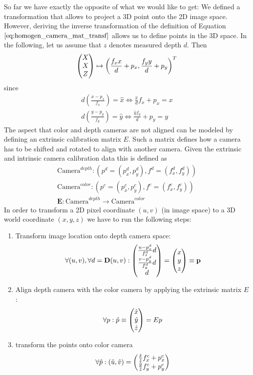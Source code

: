 So far we have exactly the opposite of what we would like to get: We defined a transformation that allows to project a 3D point onto the 2D image space. However, deriving the inverse transformation of the definition of Equation $\ref{eq:homogen_camera_mat_transf}$ allows us to define points in the 3D space. In the following, let us assume that $z$ denotes measured depth $d$. Then
\begin{equation}
	\colvec[X]{X}{Z} \mapsto \left( \frac{f_x x}{d} + p_x, \frac{f_y y}{d} + p_y \right)^T
\end{equation}
since
\begin{equation}
\begin{aligned}
	d \left( \frac{x - p_x}{f_x} \right) = \hat{x} \Leftrightarrow \frac{\hat{x}}{d} f_x + p_x = x \\
	d \left( \frac{y - p_y}{f_y} \right) = \hat{y} \Leftrightarrow \frac{\hat{y} f_y}{d} + p_y = y 
\end{aligned}
\label{eq:depth_tranfomation}
\end{equation}
The aspect that color and depth cameras are not aligned can be modeled by defining an extrinsic calibration matrix $E$. Such a matrix defines how a camera has to be shifted and rotated to align with another camera. Given the extrinsic and intrinsic camera calibration data this is defined as
\begin{equation}
\begin{aligned}
	\text{Camera}^{depth} : \left( p^d = (p_x^d, p_y^d), f^d = (f_x^d, f_y^d)\right) \\
	\text{Camera}^{color} : \left( p^c = (p_x^c, p_y^c), f^c = (f_x^c, f_y^c)\right) \\
	\textbf{E} : \text{Camera}^{depth} \rightarrow \text{Camera}^{color}
\end{aligned}
\label{eq:calib_data}
\end{equation}
In order to transform a 2D pixel coordinate $\left( u, v \right)$ (in image space) to a 3D world coordinate $\left( x, y, z \right)$ we have to run the following steps:
\begin{enumerate}
\item Transform image location onto depth camera space:
\begin{equation}
	\forall (u, v), \forall d = \textbf{D}(u,v): \colvec[\frac{u - p_x^d}{f_x^d} d]{\frac{v - p_y^d}{f_y^d} d}{d} = \colvec[x]{y}{z} \equiv \bf{p}
\end{equation}
\item Align depth camera with the color camera by applying the extrinsic matrix $E$:
\begin{equation}
	\forall p: \hat{p} \equiv \colvec[\hat{x}]{\hat{y}}{\hat{z}} =  E p
\end{equation}
\item transform the points onto color camera
\begin{equation}
	\forall \hat{p} : \left( \hat{u}, \hat{v}\right) = \colvec{\frac{\hat{x}}{\hat{z}} f_x^c + p_x^c}{\frac{\hat{y}}{\hat{z}} f_y^c + p_y^c}
\end{equation}
\end{enumerate}

